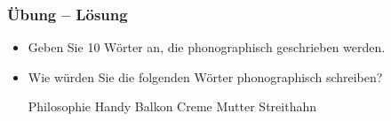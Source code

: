 
\begin{frame}
\frametitle{Übung -- Lösung}

\begin{itemize}
	\item Geben Sie 10 Wörter an, die phonographisch geschrieben werden.
	
		\begin{description}
			\item[] 
		\end{description}
	
	\item Wie würden Sie die folgenden Wörter phonographisch schreiben?
		
	\begin{exe}
	\settowidth{}
		\begin{xlist}
			\ex Philosophie 
			\ex Handy 
			\ex Balkon 
			\ex Creme 
			\ex Mutter 
			\ex Streithahn 
		\end{xlist}
	\end{exe}
		

\end{itemize}

\end{frame}

